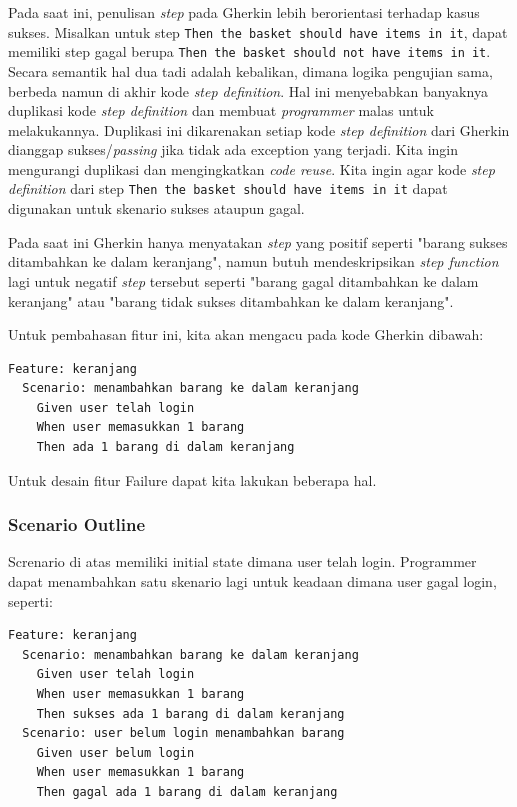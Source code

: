 Pada saat ini, penulisan \emph{step} pada Gherkin lebih berorientasi terhadap
kasus sukses. Misalkan untuk step \texttt{Then the basket should have items in it},
dapat memiliki step gagal berupa \texttt{Then the basket should not have items in it}.
Secara semantik hal dua tadi adalah kebalikan, dimana logika pengujian
sama, berbeda namun di akhir kode \emph{step definition}. Hal ini
menyebabkan banyaknya duplikasi kode \emph{step definition} dan membuat \emph{programmer} malas untuk
melakukannya.
Duplikasi ini dikarenakan setiap kode \emph{step definition} dari Gherkin dianggap
sukses/\emph{passing} jika tidak ada exception yang terjadi.
Kita ingin mengurangi duplikasi dan mengingkatkan \emph{code reuse}.
Kita ingin agar kode \emph{step definition} dari step \texttt{Then the basket should have items in it}
dapat digunakan untuk skenario sukses ataupun gagal.

Pada saat ini Gherkin hanya menyatakan \textit{step} yang positif seperti
"barang sukses ditambahkan ke dalam keranjang", namun butuh mendeskripsikan \textit{step function}
lagi untuk negatif \textit{step} tersebut seperti "barang gagal ditambahkan ke dalam keranjang" atau
"barang tidak sukses ditambahkan ke dalam keranjang".

Untuk pembahasan fitur ini, kita akan mengacu pada kode Gherkin dibawah:
\begin{lstlisting}[language=gherkin]
Feature: keranjang
  Scenario: menambahkan barang ke dalam keranjang
    Given user telah login
    When user memasukkan 1 barang
    Then ada 1 barang di dalam keranjang
\end{lstlisting}

Untuk desain fitur Failure dapat kita lakukan beberapa hal.

\subsubsection{Scenario Outline}
Screnario di atas memiliki initial state dimana user telah login.
Programmer dapat menambahkan satu skenario lagi untuk keadaan dimana user gagal login, seperti:
\begin{lstlisting}[language=gherkin]
Feature: keranjang
  Scenario: menambahkan barang ke dalam keranjang
    Given user telah login
    When user memasukkan 1 barang
    Then sukses ada 1 barang di dalam keranjang
  Scenario: user belum login menambahkan barang 
    Given user belum login
    When user memasukkan 1 barang
    Then gagal ada 1 barang di dalam keranjang
\end{lstlisting}

